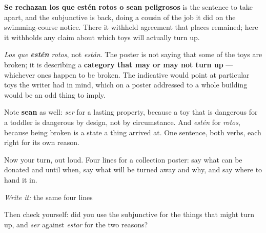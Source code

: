 \begin{culture}
\textbf{Se rechazan los que estén rotos o sean peligrosos} is the sentence to take apart, and the subjunctive is back, doing a cousin of the job it did on the swimming-course notice. There it withheld agreement that places remained; here it withholds any claim about which toys will actually turn up.

\emph{Los que \textbf{estén} rotos}, not \emph{están}. The poster is not saying that some of the toys are broken; it is describing a \textbf{category that may or may not turn up} — whichever ones happen to be broken. The indicative would point at particular toys the writer had in mind, which on a poster addressed to a whole building would be an odd thing to imply.

Note \textbf{sean} as well: \emph{ser} for a lasting property, because a toy that is dangerous for a toddler is dangerous by design, not by circumstance. And \emph{estén} for \emph{rotos}, because being broken is a state a thing arrived at. One sentence, both verbs, each right for its own reason.
\end{culture}

\begin{tcolorbox}[breakable,colback=teal!4,colframe=teal!35!black,title={Before you move on}]
Now your turn, out loud. Four lines for a collection poster: say what can be donated and until when, say what will be turned away and why, and say where to hand it in.

\emph{Write it:} the same four lines

Then check yourself: did you use the subjunctive for the things that might turn up, and \emph{ser} against \emph{estar} for the two reasons?
\end{tcolorbox}
